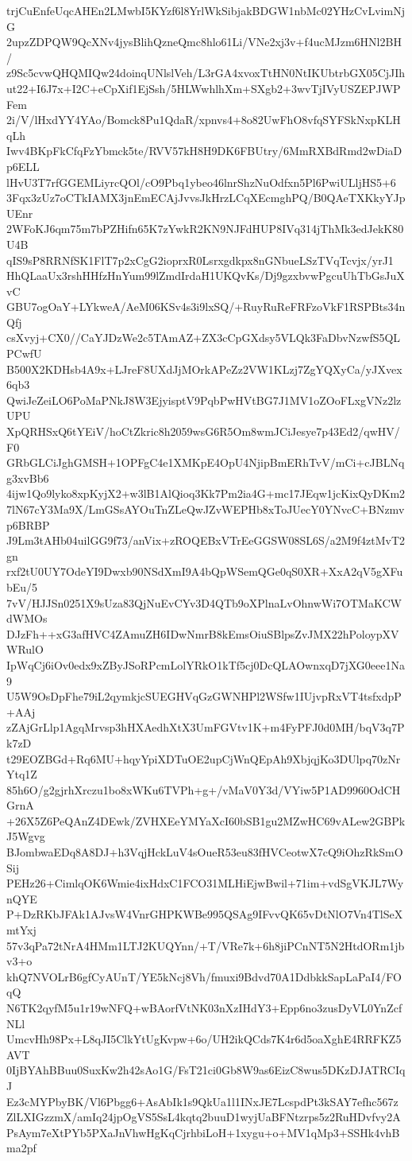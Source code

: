 trjCuEnfeUqcAHEn2LMwbI5KYzf6l8YrlWkSibjakBDGW1nbMc02YHzCvLvimNjG
2upzZDPQW9QcXNv4jysBlihQzneQmc8hlo61Li/VNe2xj3v+f4ucMJzm6HNl2BH/
z9Sc5cvwQHQMIQw24doinqUNlslVeh/L3rGA4xvoxTtHN0NtIKUbtrbGX05CjJIh
ut22+I6J7x+I2C+eCpXif1EjSsh/5HLWwhlhXm+SXgb2+3wvTjIVyUSZEPJWPFem
2i/V/lHxdYY4YAo/Bomck8Pu1QdaR/xpnvs4+8o82UwFhO8vfqSYFSkNxpKLHqLh
Iwv4BKpFkCfqFzYbmck5te/RVV57kH8H9DK6FBUtry/6MmRXBdRmd2wDiaDp6ELL
lHvU3T7rfGGEMLiyrcQOl/cO9Pbq1ybeo46lnrShzNuOdfxn5Pl6PwiULljHS5+6
3Fqx3zUz7oCTkIAMX3jnEmECAjJvvsJkHrzLCqXEcmghPQ/B0QAeTXKkyYJpUEnr
2WFoKJ6qm75m7bPZHifn65K7zYwkR2KN9NJFdHUP8IVq314jThMk3edJekK80U4B
qIS9sP8RRNfSK1FlT7p2xCgG2ioprxR0Lsrxgdkpx8nGNbueLSzTVqTcvjx/yrJ1
HhQLaaUx3rshHHfzHnYum99lZmdIrdaH1UKQvKs/Dj9gzxbvwPgcuUhTbGsJuXvC
GBU7ogOaY+LYkweA/AeM06KSv4s3i9lxSQ/+RuyRuReFRFzoVkF1RSPBts34nQfj
csXvyj+CX0//CaYJDzWe2c5TAmAZ+ZX3cCpGXdsy5VLQk3FaDbvNzwfS5QLPCwfU
B500X2KDHsb4A9x+LJreF8UXdJjMOrkAPeZz2VW1KLzj7ZgYQXyCa/yJXvex6qb3
QwiJeZeiLO6PoMaPNkJ8W3EjyisptV9PqbPwHVtBG7J1MV1oZOoFLxgVNz2lzUPU
XpQRHSxQ6tYEiV/hoCtZkric8h2059wsG6R5Om8wmJCiJesye7p43Ed2/qwHV/F0
GRbGLCiJghGMSH+1OPFgC4e1XMKpE4OpU4NjipBmERhTvV/mCi+cJBLNqg3xvBb6
4ijw1Qo9lyko8xpKyjX2+w3lB1AlQioq3Kk7Pm2ia4G+mc17JEqw1jcKixQyDKm2
7lN67cY3Ma9X/LmGSsAYOuTnZLeQwJZvWEPHb8xToJUecY0YNvcC+BNzmvp6BRBP
J9Lm3tAHb04uilGG9f73/anVix+zROQEBxVTrEeGGSW08SL6S/a2M9f4ztMvT2gn
rxf2tU0UY7OdeYI9Dwxb90NSdXmI9A4bQpWSemQGe0qS0XR+XxA2qV5gXFubEu/5
7vV/HJJSn0251X9sUza83QjNuEvCYv3D4QTb9oXPlnaLvOhnwWi7OTMaKCWdWMOs
DJzFh++xG3afHVC4ZAmuZH6IDwNmrB8kEmsOiuSBlpsZvJMX22hPoloypXVWRulO
IpWqCj6iOv0edx9xZByJSoRPcmLolYRkO1kTf5cj0DcQLAOwnxqD7jXG0eee1Na9
U5W9OsDpFhe79iL2qymkjcSUEGHVqGzGWNHPl2WSfw1IUjvpRxVT4tsfxdpP+AAj
zZAjGrLlp1AgqMrvsp3hHXAedhXtX3UmFGVtv1K+m4FyPFJ0d0MH/bqV3q7Pk7zD
t29EOZBGd+Rq6MU+hqyYpiXDTuOE2upCjWnQEpAh9XbjqjKo3DUlpq70zNrYtq1Z
85h6O/g2gjrhXrczu1bo8xWKu6TVPh+g+/vMaV0Y3d/VYiw5P1AD9960OdCHGrnA
+26X5Z6PeQAnZ4DEwk/ZVHXEeYMYaXcI60bSB1gu2MZwHC69vALew2GBPkJ5Wgvg
BJombwaEDq8A8DJ+h3VqjHckLuV4sOueR53eu83fHVCeotwX7cQ9iOhzRkSmOSij
PEHz26+CimlqOK6Wmie4ixHdxC1FCO31MLHiEjwBwil+71im+vdSgVKJL7WynQYE
P+DzRKbJFAk1AJvsW4VnrGHPKWBe995QSAg9IFvvQK65vDtNlO7Vn4TlSeXmtYxj
57v3qPa72tNrA4HMm1LTJ2KUQYnn/+T/VRe7k+6h8jiPCnNT5N2HtdORm1jbv3+o
khQ7NVOLrB6gfCyAUnT/YE5kNcj8Vh/fmuxi9Bdvd70A1DdbkkSapLaPaI4/FOqQ
N6TK2qyfM5u1r19wNFQ+wBAorfVtNK03nXzIHdY3+Epp6no3zusDyVL0YnZcfNLl
UmcvHh98Px+L8qJI5ClkYtUgKvpw+6o/UH2ikQCds7K4r6d5oaXghE4RRFKZ5AVT
0IjBYAhBBuu0SuxKw2h42sAo1G/FsT21ci0Gb8W9as6EizC8wus5DKzDJATRCIqJ
Ez3cMYPbyBK/Vl6Pbgg6+AsAbIk1s9QkUa1l1INxJE7LcspdPt3kSAY7efhc567z
ZlLXIGzzmX/amIq24jpOgVS5SsL4kqtq2buuD1wyjUaBFNtzrps5z2RuHDvfvy2A
PsAym7eXtPYb5PXaJnVhwHgKqCjrhbiLoH+1xygu+o+MV1qMp3+SSHk4vhBma2pf
